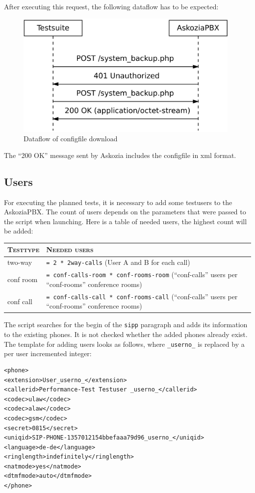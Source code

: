 After executing this request, the following dataflow has to be expected:
\begin{figure} [htbp]
\centering
\includegraphics [width=11cm] {config-2}
\caption {Dataflow of configfile download}
\end{figure}
The ``200 OK'' message sent by Askozia includes the configfile in xml format.

\subsection{Users}
For executing the planned tests, it is necessary to add some testusers to the AskoziaPBX.
The count of users depends on the parameters that were passed to the script when launching.
Here is a table of needed users, the highest count will be added:

\begin{tabular}{|p{2cm}|p{13cm}|} \hline
	\textsc{Testtype} & \textsc{Needed users} \\ \hline \hline
	two-way & \texttt{= 2 * 2way-calls} (User A and B for each call) \\
	conf room & \texttt{= conf-calls-room * conf-rooms-room} \newline (``conf-calls'' users per ``conf-rooms'' conference rooms) \\
	conf call & \texttt{= conf-calls-call * conf-rooms-call} \newline (``conf-calls'' users per ``conf-rooms'' conference rooms) \\
	\hline
\end{tabular}

The script searches for the begin of the \texttt{sipp} paragraph and adds its information to the existing phones.
It is not checked whether the added phones already exist. The template for adding users looks as follows, where
\texttt{\_userno\_} is replaced by a per user incremented integer:
\begin{lstlisting}[breaklines=true,label=code:config-post-request,caption={Conference room template} ]
<phone>
<extension>User_userno_</extension>
<callerid>Performance-Test Testuser _userno_</callerid>
<codec>ulaw</codec>
<codec>alaw</codec>
<codec>gsm</codec>
<secret>0815</secret>
<uniqid>SIP-PHONE-1357012154bbefaaa79d96_userno_</uniqid>
<language>de-de</language>
<ringlength>indefinitely</ringlength>
<natmode>yes</natmode>
<dtmfmode>auto</dtmfmode>
</phone>
\end{lstlisting}

